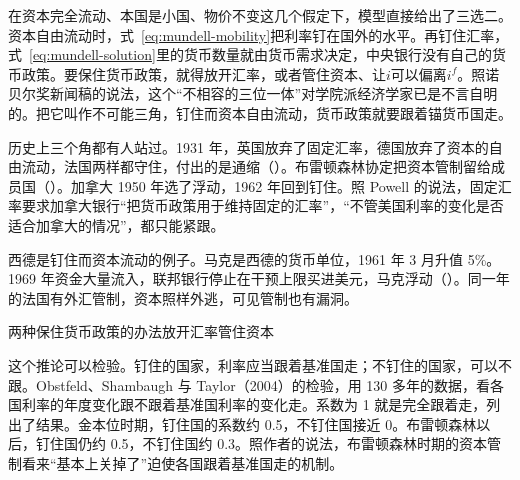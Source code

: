 在资本完全流动、本国是小国、物价不变这几个假定下，模型直接给出了三选二。资本自由流动时，式~\eqref{eq:mundell-mobility}把利率钉在国外的水平。再钉住汇率，式~\eqref{eq:mundell-solution}里的货币数量就由货币需求决定，中央银行没有自己的货币政策。要保住货币政策，就得放开汇率，或者管住资本、让$i$可以偏离$i^{f}$。照诺贝尔奖新闻稿的说法，这个“不相容的三位一体”对学院派经济学家已是不言自明的\cite{nobel1999}。把它叫作不可能三角，钉住而资本自由流动，货币政策就要跟着锚货币国走。

历史上三个角都有人站过。1931 年，英国放弃了固定汇率，德国放弃了资本的自由流动，法国两样都守住，付出的是通缩（）。布雷顿森林协定把资本管制留给成员国（）。加拿大 1950 年选了浮动，1962 年回到钉住。照 Powell 的说法，固定汇率要求加拿大银行“把货币政策用于维持固定的汇率”，“不管美国利率的变化是否适合加拿大的情况”，都只能紧跟\cite{powell2005}。

西德是钉住而资本流动的例子。马克是西德的货币单位，1961 年 3 月升值 5\%。1969 年资金大量流入，联邦银行停止在干预上限买进美元，马克浮动（）\cite{bis36}。同一年的法国有外汇管制，资本照样外逃，可见管制也有漏洞\cite{bis36}。

\begin{compare}{两种保住货币政策的办法}{放开汇率}{管住资本}
\end{compare}

这个推论可以检验。钉住的国家，利率应当跟着基准国走；不钉住的国家，可以不跟。Obstfeld、Shambaugh 与 Taylor（2004）的检验，用 130 多年的数据，看各国利率的年度变化跟不跟着基准国利率的变化走\cite{ost2004}。系数为 1 就是完全跟着走，列出了结果。金本位时期，钉住国的系数约 0.5，不钉住国接近 0\cite{ost2004}。布雷顿森林以后，钉住国仍约 0.5，不钉住国约 0.3\cite{ost2004}。照作者的说法，布雷顿森林时期的资本管制看来“基本上关掉了”迫使各国跟着基准国走的机制\cite{ost2004}。

